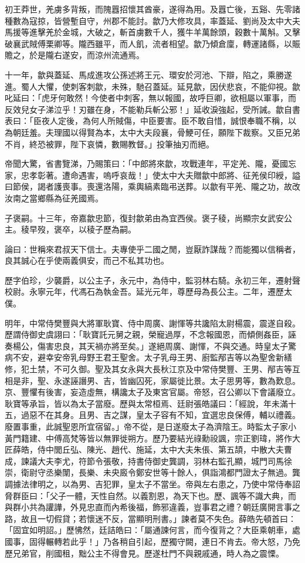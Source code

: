 \begin{pinyinscope}
初王莽世，羌虜多背叛，而隗囂招懷其酋豪，遂得為用。及囂亡後，五谿、先零諸種數為寇掠，皆營塹自守，州郡不能討。歙乃大修攻具，率蓋延、劉尚及太中大夫馬援等進擊羌於金城，大破之，斬首虜數千人，獲牛羊萬餘頭，穀數十萬斛。又擊破襄武賊傅栗卿等。隴西雖平，而人飢，流者相望。歙乃傾倉廩，轉運諸縣，以賑贍之，於是隴右遂安，而涼州流通焉。

十一年，歙與蓋延、馬成進攻公孫述將王元、環安於河池、下辯，陷之，乘勝遂進。蜀人大懼，使刺客刺歙，未殊，馳召蓋延。延見歙，因伏悲哀，不能仰視。歙叱延曰：「虎牙何敢然！今使者中刺客，無以報國，故呼巨卿，欲相屬以軍事，而反效兒女子涕泣乎！刃雖在身，不能勒兵斬公邪！」延收淚強起，受所誡。歙自書表曰：「臣夜人定後，為何人所賊傷，中臣要害。臣不敢自惜，誠恨奉職不稱，以為朝廷羞。夫理國以得賢為本，太中大夫段襄，骨鯁可任，願陛下裁察。又臣兄弟不肖，終恐被罪，陛下哀憐，數賜教督。」投筆抽刃而絕。

帝聞大驚，省書覽涕，乃賜策曰：「中郎將來歙，攻戰連年，平定羌、隴，憂國忘家，忠孝彰著。遭命遇害，嗚呼哀哉！」使太中大夫贈歙中郎將、征羌侯印綬，謚曰節侯，謁者護喪事。喪還洛陽，乘輿縞素臨弔送葬。以歙有平羌、隴之功，故改汝南之當鄉縣為征羌國焉。

子褒嗣。十三年，帝嘉歙忠節，復封歙弟由為宜西侯。褒子稜，尚顯宗女武安公主。稜早歿，褒卒，以稜子歷為嗣。

論曰：世稱來君叔天下信士。夫專使乎二國之閒，豈厭詐謀哉？而能獨以信稱者，良其誠心在乎使兩義俱安，而己不私其功也。

歷字伯珍，少襲爵，以公主子，永元中，為侍中，監羽林右騎。永初三年，遷射聲校尉。永寧元年，代馮石為執金吾。延光元年，尊歷母為長公主。二年，遷歷太僕。

明年，中常侍樊豐與大將軍耿寶、侍中周廣、謝惲等共讒陷太尉楊震，震遂自殺。歷謂侍御史虞詡曰：「耿寶託元舅之親，榮寵過厚，不念報國恩，而傾側姦臣，誣奏楊公，傷害忠良，其天禍亦將至矣。」遂絕周廣、謝惲，不與交通。時皇太子驚病不安，避幸安帝乳母野王君王聖舍。太子乳母王男、廚監邴吉等以為聖舍新繕修，犯土禁，不可久御。聖及其女永與大長秋江京及中常侍樊豐、王男、邴吉等互相是非，聖、永遂誣譖男、吉，皆幽囚死，家屬徙比景。太子思男等，數為歎息。京、豐懼有後害，妄造虛無，構讒太子及東宮官屬。帝怒，召公卿以下會議廢立。耿寶等承旨，皆以為太子當廢。歷與太常桓焉、廷尉張皓議曰：「經說，年未滿十五，過惡不在其身。且男、吉之謀，皇太子容有不知，宜選忠良保傅，輔以禮義。廢置事重，此誠聖恩所宜宿留。」帝不從，是日遂廢太子為濟陰王。時監太子家小黃門籍建、中傅高梵等皆以無罪徙朔方。歷乃要結光祿勳祋諷，宗正劉瑋，將作大匠薛皓，侍中閭丘弘、陳光、趙代、施延，太中大夫朱倀、第五頡，中散大夫曹成，諫議大夫李尤，符節令張敬，持書侍御史龔調，羽林右監孔顯，城門司馬徐崇，衛尉守丞樂闈，長樂、未央廄令鄭安世等十餘人，俱詣鴻都門證太子無過。龔調據法律明之，以為男、吉犯罪，皇太子不當坐。帝與左右患之，乃使中常侍奉詔脅群臣曰：「父子一體，天性自然。以義割恩，為天下也。歷、諷等不識大典，而與群小共為讙譁，外見忠直而內希後福，飾邪違義，豈事君之禮？朝廷廣開言事之路，故且一切假貸；若懷迷不反，當顯明刑書。」諫者莫不失色。薛皓先頓首曰：「固宜如明詔。」歷怫然，廷詰皓曰：「屬通諫何言，而今復背之？大臣乘朝車，處國事，固得輾轉若此乎！」乃各稍自引起，歷獨守闕，連日不肯去。帝大怒，乃免歷兄弟官，削國租，黜公主不得會見。歷遂杜門不與親戚通，時人為之震慄。


\end{pinyinscope}
